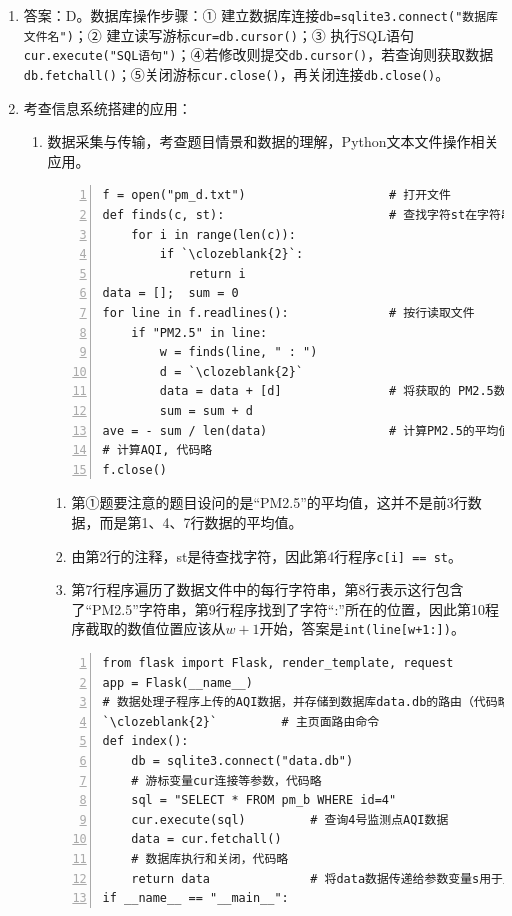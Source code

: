 \begin{enumerate}
\item 答案：D。数据库操作步骤：① 建立数据库连接\lstinline|db=sqlite3.connect("数据库文件名")|；② 建立读写游标\lstinline|cur=db.cursor()|；③ 执行SQL语句\lstinline|cur.execute("SQL语句")|；④若修改则提交\lstinline|db.cursor()|，若查询则获取数据\lstinline|db.fetchall()|；⑤关闭游标\lstinline|cur.close()|，再关闭连接\lstinline|db.close()|。

\item 考查信息系统搭建的应用：
	\begin{enumerate}[label=$(\arabic*)$]
	\item 数据采集与传输，考查题目情景和数据的理解，Python文本文件操作相关应用。
\setcounter{qnumber}{1}
\begin{lstlisting}[numbers=left]
f = open("pm_d.txt") 					# 打开文件
def finds(c, st):						# 查找字符st在字符串c中的位置
    for i in range(len(c)):
        if `\clozeblank{2}`:
            return i
data = [];  sum = 0
for line in f.readlines():			    # 按行读取文件
    if "PM2.5" in line:
        w = finds(line, " : ")
        d = `\clozeblank{2}`
        data = data + [d] 				# 将获取的 PM2.5数据保存到列表中
        sum = sum + d 
ave = - sum / len(data) 				# 计算PM2.5的平均值
# 计算AQI, 代码略
f.close()
\end{lstlisting}
		\begin{enumerate}[label=$(\alph*)$]
		\item 第①题要注意的题目设问的是“PM2.5”的平均值，这并不是前3行数据，而是第1、4、7行数据的平均值。
		\item 由第2行的注释，st是待查找字符，因此第4行程序\lstinline|c[i] == st|。
		\item 第7行程序遍历了数据文件中的每行字符串，第8行表示这行包含了“PM2.5”字符串，第9行程序找到了字符“:”所在的位置，因此第10程序截取的数值位置应该从$w+1$开始，答案是\lstinline|int(line[w+1:])|。
		\end{enumerate}	
\setcounter{qnumber}{1}
\begin{lstlisting}[numbers=left]
from flask import Flask, render_template, request
app = Flask(__name__)
# 数据处理子程序上传的AQI数据，并存储到数据库data.db的路由（代码略）
`\clozeblank{2}` 	  	 # 主页面路由命令
def index():
    db = sqlite3.connect("data.db")
    # 游标变量cur连接等参数，代码略
    sql = "SELECT * FROM pm_b WHERE id=4"
    cur.execute(sql)         # 查询4号监测点AQI数据
    data = cur.fetchall()
    # 数据库执行和关闭，代码略
    return data              # 将data数据传递给参数变量s用于显示在网页中
if __name__ == "__main__":

\end{lstlisting}
\end{enumerate}
\end{enumerate}
